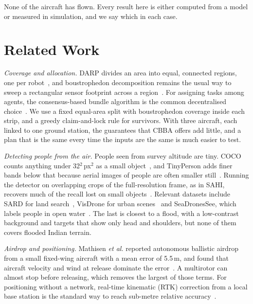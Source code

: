 \documentclass[conference]{IEEEtran}
\begin{document}
None of the aircraft has flown. Every result here is either computed from a
model or measured in simulation, and we say which in each case.

\section{Related Work}

\textit{Coverage and allocation.} DARP divides an area into equal, connected
regions, one per robot~\cite{kapoutsis2017darp}, and boustrophedon decomposition
remains the usual way to sweep a rectangular sensor footprint across a
region~\cite{choset2000coverage}. For assigning tasks among agents, the
consensus-based bundle algorithm is the common decentralised
choice~\cite{choi2009cbba}. We use a fixed equal-area split with boustrophedon
coverage inside each strip, and a greedy claim-and-lock rule for survivors. With
three aircraft, each linked to one ground station, the guarantees that CBBA
offers add little, and a plan that is the same every time the inputs are the
same is much easier to test.

\textit{Detecting people from the air.} People seen from survey altitude are
tiny. COCO counts anything under 32$^2$\,px$^2$ as a small
object~\cite{lin2014coco}, and TinyPerson adds finer bands below that because
aerial images of people are often smaller still~\cite{yu2020tinyperson}.
Running the detector on overlapping crops of the full-resolution frame, as in
SAHI, recovers much of the recall lost on small objects~\cite{akyon2022sahi}.
Relevant datasets include SARD for land search~\cite{sambolek2021sard},
VisDrone for urban scenes~\cite{zhu2021visdrone} and SeaDronesSee, which labels
people in open water~\cite{varga2022seadronessee}. The last is closest to a
flood, with a low-contrast background and targets that show only head and
shoulders, but none of them covers flooded Indian terrain.

\textit{Airdrop and positioning.} Mathisen \emph{et al.} reported autonomous
ballistic airdrop from a small fixed-wing aircraft with a mean error of
5.5\,m, and found that aircraft velocity and wind at release dominate the
error~\cite{mathisen2020airdrop}. A multirotor can almost stop before releasing,
which removes the largest of those terms. For positioning without a network,
real-time kinematic (RTK) correction from a local base station is the standard
way to reach sub-metre relative accuracy~\cite{takasu2009rtklib}.
\end{document}
